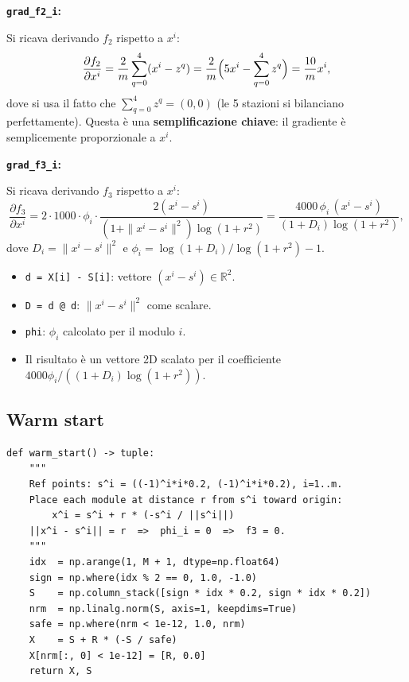\documentclass[12pt,a4paper]{article}
\theoremstyle{definition}
\newcommand{\R}{\mathbb{R}}
\begin{document}
\textbf{\texttt{grad\_f2\_i}:}

Si ricava derivando $f_2$ rispetto a $x^i$:
\[
  \frac{\partial f_2}{\partial x^i}
  = \frac{2}{m} \sum_{q=0}^{4} (x^i - z^q)
  = \frac{2}{m} \Bigl(5 x^i - \sum_{q=0}^4 z^q\Bigr)
  = \frac{10}{m} x^i,
\]
dove si usa il fatto che $\sum_{q=0}^4 z^q = (0,0)$ (le 5 stazioni si bilanciano perfettamente).
Questa è una \textbf{semplificazione chiave}: il gradiente è semplicemente proporzionale a $x^i$.

\textbf{\texttt{grad\_f3\_i}:}

Si ricava derivando $f_3$ rispetto a $x^i$:
\[
  \frac{\partial f_3}{\partial x^i}
  = 2 \cdot 1000 \cdot \phi_i \cdot \frac{2(x^i - s^i)}{(1 + \|x^i - s^i\|^2)\log(1+r^2)}
  = \frac{4000 \, \phi_i \,(x^i - s^i)}{(1 + D_i)\log(1+r^2)},
\]
dove $D_i = \|x^i - s^i\|^2$ e $\phi_i = \log(1+D_i)/\log(1+r^2) - 1$.
\begin{itemize}[nosep]
  \item \texttt{d = X[i] - S[i]}: vettore $(x^i - s^i) \in \R^2$.
  \item \texttt{D = d @ d}: $\|x^i - s^i\|^2$ come scalare.
  \item \texttt{phi}: $\phi_i$ calcolato per il modulo $i$.
  \item Il risultato è un vettore 2D scalato per il coefficiente $4000\phi_i / ((1+D_i)\log(1+r^2))$.
\end{itemize}

\subsection{Warm start}

\begin{lstlisting}[caption={Righe 186–201 — Inizializzazione con $f_3 = 0$}]
def warm_start() -> tuple:
    """
    Ref points: s^i = ((-1)^i*i*0.2, (-1)^i*i*0.2), i=1..m.
    Place each module at distance r from s^i toward origin:
        x^i = s^i + r * (-s^i / ||s^i||)
    ||x^i - s^i|| = r  =>  phi_i = 0  =>  f3 = 0.
    """
    idx  = np.arange(1, M + 1, dtype=np.float64)
    sign = np.where(idx % 2 == 0, 1.0, -1.0)
    S    = np.column_stack([sign * idx * 0.2, sign * idx * 0.2])
    nrm  = np.linalg.norm(S, axis=1, keepdims=True)
    safe = np.where(nrm < 1e-12, 1.0, nrm)
    X    = S + R * (-S / safe)
    X[nrm[:, 0] < 1e-12] = [R, 0.0]
    return X, S
\end{lstlisting}
\end{document}
